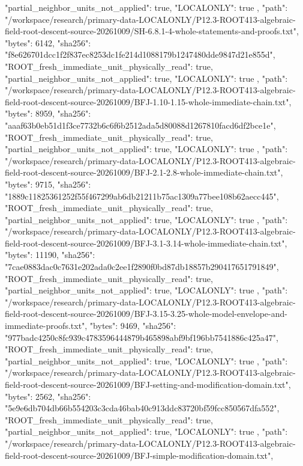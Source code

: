 \documentclass[11pt]{article}
\begin{document}
\begin{Full422Data}
{{      "partial_neighbor_units_not_applied": true,
      "LOCALONLY": true
    },
    {
      "path": "/workspace/research/primary-data-LOCALONLY/P12.3-ROOT413-algebraic-field-root-descent-source-20261009/SH-6.8.1-4-whole-statements-and-proofs.txt",
      "bytes": 6142,
      "sha256": "f8e626701dcc1f2f837ec8253dc1fe214d1088179b1247480dde9847d21e855d",
      "ROOT_fresh_immediate_unit_physically_read": true,
      "partial_neighbor_units_not_applied": true,
      "LOCALONLY": true
    },
    {
      "path": "/workspace/research/primary-data-LOCALONLY/P12.3-ROOT413-algebraic-field-root-descent-source-20261009/BFJ-1.10-1.15-whole-immediate-chain.txt",
      "bytes": 8959,
      "sha256": "aaaf63b0eb51d1f3ce7732b6c6f6b2512ada5d80088d1267810facd6df2bce1e",
      "ROOT_fresh_immediate_unit_physically_read": true,
      "partial_neighbor_units_not_applied": true,
      "LOCALONLY": true
    },
    {
      "path": "/workspace/research/primary-data-LOCALONLY/P12.3-ROOT413-algebraic-field-root-descent-source-20261009/BFJ-2.1-2.8-whole-immediate-chain.txt",
      "bytes": 9715,
      "sha256": "1889c11825361252f55f467299ab6db21211b75ac1309a77bee108b62aecc445",
      "ROOT_fresh_immediate_unit_physically_read": true,
      "partial_neighbor_units_not_applied": true,
      "LOCALONLY": true
    },
    {
      "path": "/workspace/research/primary-data-LOCALONLY/P12.3-ROOT413-algebraic-field-root-descent-source-20261009/BFJ-3.1-3.14-whole-immediate-chain.txt",
      "bytes": 11190,
      "sha256": "7cae0883dac0c7631e202ada0c2ee1f2890f0bd87db18857b290417651791849",
      "ROOT_fresh_immediate_unit_physically_read": true,
      "partial_neighbor_units_not_applied": true,
      "LOCALONLY": true
    },
    {
      "path": "/workspace/research/primary-data-LOCALONLY/P12.3-ROOT413-algebraic-field-root-descent-source-20261009/BFJ-3.15-3.25-whole-model-envelope-and-immediate-proofs.txt",
      "bytes": 9469,
      "sha256": "977badc4250c8fc939c4783596444879b465898abf9bf196bb7541886c425a47",
      "ROOT_fresh_immediate_unit_physically_read": true,
      "partial_neighbor_units_not_applied": true,
      "LOCALONLY": true
    },
    {
      "path": "/workspace/research/primary-data-LOCALONLY/P12.3-ROOT413-algebraic-field-root-descent-source-20261009/BFJ-setting-and-modification-domain.txt",
      "bytes": 2562,
      "sha256": "5e9e6db704db66b554203c3cda46bab40c913ddc83720bf59fcc850567dfa552",
      "ROOT_fresh_immediate_unit_physically_read": true,
      "partial_neighbor_units_not_applied": true,
      "LOCALONLY": true
    },
    {
      "path": "/workspace/research/primary-data-LOCALONLY/P12.3-ROOT413-algebraic-field-root-descent-source-20261009/BFJ-simple-modification-domain.txt",
}}
\end{Full422Data}
\end{document}
